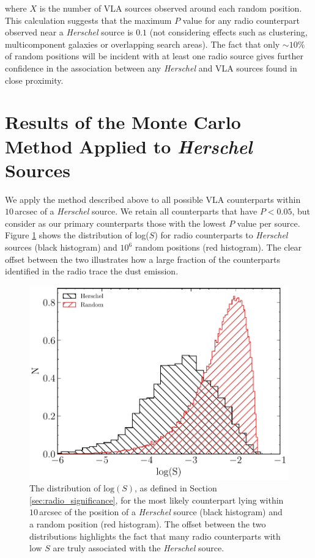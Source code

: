 \noindent where $X$ is the number of VLA sources observed around each random position. This calculation suggests that the maximum $P$ value for any radio counterpart observed near a \textit{Herschel} source is $0.1$ (not considering effects such as clustering, multicomponent galaxies or overlapping search areas). The fact that only $\sim 10\%$ of random positions will be incident with at least one radio source gives further confidence in the association between any \textit{Herschel} and VLA sources found in close proximity.

\section{Results of the Monte Carlo Method Applied to \textit{Herschel} Sources}

We apply the method described above to all possible VLA counterparts within $10\,$arcsec of a \textit{Herschel} source. We retain all counterparts that have $P < 0.05$, but consider as our primary counterparts those with the lowest $P$ value per source. Figure \ref{fig:ds_distributions} shows the distribution of log($S$) for radio counterparts to \textit{Herschel} sources (black histogram) and $10^6$ random positions (red histogram). The clear offset between the two illustrates how a large fraction of the counterparts identified in the radio trace the dust emission.

\begin{figure}
	\centering
	\includegraphics[width=0.78\columnwidth]{Figures/ds_distributions.pdf}
	\caption[Distribution of $\textrm{log}(S)$ for \textit{Herschel} sources and random positions]{The distribution of $\textrm{log}(S)$, as defined in Section \ref{sec:radio_significance}, for the most likely counterpart lying within $10\,$arcsec of the position of a \textit{Herschel} source (black histogram) and a random position (red histogram). The offset between the two distributions highlights the fact that many radio counterparts with low $S$ are truly associated with the \textit{Herschel} source.}
	\label{fig:ds_distributions}
\end{figure}

